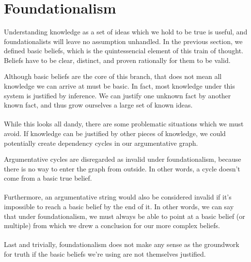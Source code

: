 \documentclass[11pt]{article}
\begin{document}
	\pagebreak{}
	\section*{Foundationalism}
	\paragraph{} Understanding knowledge as a set of ideas which we hold to be true is useful, and foundationalists will leave no assumption unhandled. In the previous section, we defined basic beliefs, which is the quintessencial element of this train of thought. Beliefs have to be clear, distinct, and proven rationally for them to be valid.

	Although basic beliefs are the core of this branch, that does not mean all knowledge we can arrive at must be basic. In fact, most knowledge under this system is justified by inference. We can justify one unknown fact by another known fact, and thus grow ourselves a large set of known ideas.

	\paragraph{} While this looks all dandy, there are some problematic situations which we must avoid. If knowledge can be justified by other pieces of knowledge, we could potentially create dependency cycles in our argumentative graph.

	Argumentative cycles are disregarded as invalid under foundationalism, because there is no way to enter the graph from outside. In other words, a cycle doesn't come from a basic true belief.

	\paragraph{} Furthermore, an argumentative string would also be considered invalid if it's impossible to reach a basic belief by the end of it. In other words, we can say that under foundationalism, we must always be able to point at a basic belief (or multiple) from which we drew a conclusion for our more complex beliefs.

	\paragraph{} Last and trivially, foundationalism does not make any sense as the groundwork for truth if the basic beliefs we're using are not themselves justified.
\end{document}
